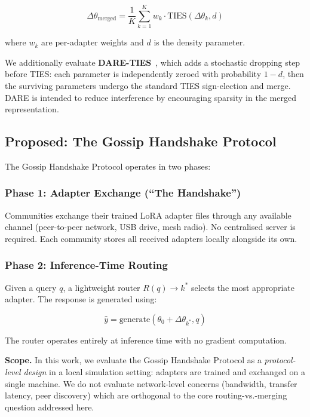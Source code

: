 \documentclass[conference, 10pt]{IEEEtran}
\begin{document}
\begin{equation}
    \Delta\theta_{\text{merged}} = \frac{1}{K} \sum_{k=1}^{K}
    w_k \cdot \text{TIES}(\Delta\theta_k, d)
\end{equation}

\noindent where $w_k$ are per-adapter weights and $d$ is the density
parameter.

We additionally evaluate \textbf{DARE-TIES}~\cite{yu2024dare}, which
adds a stochastic dropping step before TIES: each parameter is
independently zeroed with probability $1 - d$, then the surviving
parameters undergo the standard TIES sign-election and merge.
DARE is intended to reduce interference by encouraging sparsity in
the merged representation.

\subsection{Proposed: The Gossip Handshake Protocol}
\label{sec:gossip}

The Gossip Handshake Protocol operates in two phases:

\subsubsection{Phase 1: Adapter Exchange (``The Handshake'')}
Communities exchange their trained LoRA adapter files through any
available channel (peer-to-peer network, USB drive, mesh radio).
No centralised server is required.
Each community stores all received adapters locally alongside its own.

\subsubsection{Phase 2: Inference-Time Routing}
Given a query $q$, a lightweight router $R(q) \to k^*$ selects the
most appropriate adapter. The response is generated using:

\begin{equation}
    \hat{y} = \text{generate}(\theta_0 + \Delta\theta_{k^*}, q)
\end{equation}

\noindent The router operates entirely at inference time with no
gradient computation.

\textbf{Scope.}
In this work, we evaluate the Gossip Handshake Protocol as a
\emph{protocol-level design} in a local simulation setting:
adapters are trained and exchanged on a single machine.
We do not evaluate network-level concerns (bandwidth, transfer
latency, peer discovery) which are orthogonal to the core
routing-vs.-merging question addressed here.
\end{document}
